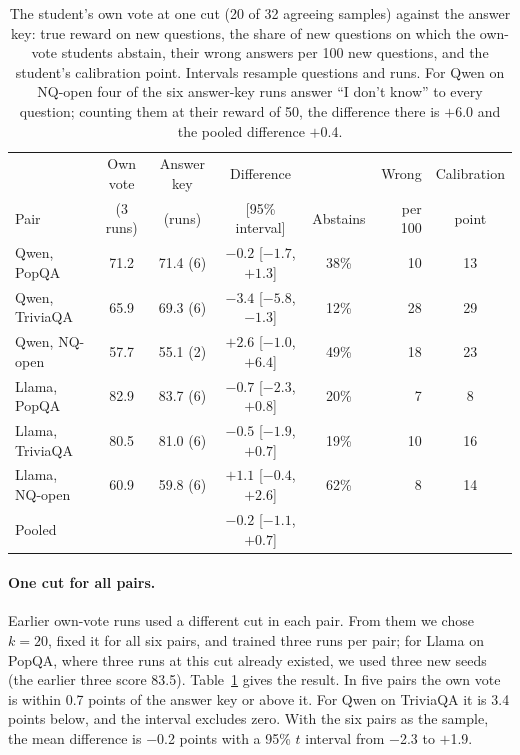 \documentclass[11pt,a4paper,twocolumn]{article}
\newcommand{\idk}{``I don't know''}
\begin{document}
\begin{table}[t]
\small
\centering
\setlength{\tabcolsep}{5pt}
\begin{tabular}{@{}lccccrc@{}}
\toprule
 & Own vote & Answer key & Difference & & Wrong & Calibration \\
Pair & (3 runs) & (runs) & [95\% interval] & Abstains & per 100 & point \\
\midrule
Qwen, PopQA & 71.2 & 71.4 (6) & $-0.2$ [$-1.7$, $+1.3$] & 38\% & 10 & 13 \\
Qwen, TriviaQA & 65.9 & 69.3 (6) & $-3.4$ [$-5.8$, $-1.3$] & 12\% & 28 & 29 \\
Qwen, NQ-open & 57.7 & 55.1 (2) & $+2.6$ [$-1.0$, $+6.4$] & 49\% & 18 & 23 \\
Llama, PopQA & 82.9 & 83.7 (6) & $-0.7$ [$-2.3$, $+0.8$] & 20\% & 7 & 8 \\
Llama, TriviaQA & 80.5 & 81.0 (6) & $-0.5$ [$-1.9$, $+0.7$] & 19\% & 10 & 16 \\
Llama, NQ-open & 60.9 & 59.8 (6) & $+1.1$ [$-0.4$, $+2.6$] & 62\% & 8 & 14 \\
\midrule
Pooled & & & $-0.2$ [$-1.1$, $+0.7$] & & & \\
\bottomrule
\end{tabular}
\caption{The student's own vote at one cut (20 of 32 agreeing samples) against the answer key: true reward on new questions, the share of new questions on which the own-vote students abstain, their wrong answers per 100 new questions, and the student's calibration point. Intervals resample questions and runs. For Qwen on NQ-open four of the six answer-key runs answer \idk{} to every question; counting them at their reward of 50, the difference there is $+$6.0 and the pooled difference $+$0.4.}
\label{tab:own}
\end{table}

\paragraph{One cut for all pairs.} Earlier own-vote runs used a different cut in each pair. From them we chose $k = 20$, fixed it for all six pairs, and trained three runs per pair; for Llama on PopQA, where three runs at this cut already existed, we used three new seeds (the earlier three score 83.5). Table~\ref{tab:own} gives the result. In five pairs the own vote is within 0.7 points of the answer key or above it. For Qwen on TriviaQA it is 3.4 points below, and the interval excludes zero. With the six pairs as the sample, the mean difference is $-$0.2 points with a 95\% $t$ interval from $-$2.3 to $+$1.9.
\end{document}
